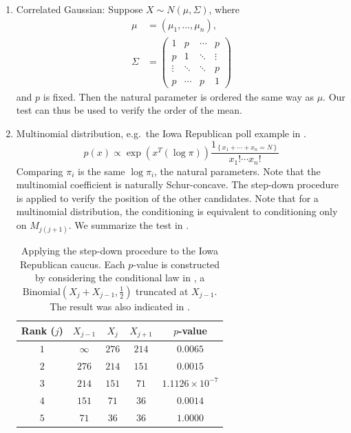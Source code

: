 \documentclass[11pt]{article}
\begin{document}
\begin{enumerate}

\item Correlated Gaussian: Suppose $X \sim N\left(\mu, \Sigma\right)$, where
\begin{align*}
\mu & = \left(\mu_1, \ldots, \mu_n\right), \\
\Sigma & = \begin{pmatrix}
1 & p & \cdots & p \\
p & 1 & \ddots & \vdots \\
\vdots & \ddots & \ddots & p \\
p & \cdots & p & 1
\end{pmatrix}
\end{align*}
and $p$ is fixed. Then the natural parameter is ordered the same way as $\mu$. Our test can thus be used to verify the order of the mean.

\item Multinomial distribution, e.g.\ the Iowa Republican poll example in .
$$p\left(x\right) \propto \exp\left(x^T \left(\log \pi\right)\right) \frac{1_{\left\{x_1 + \cdots + x_n = N\right\}}}{x_1! \cdots x_n!}$$
Comparing $\pi_i$ is the same $\log \pi_i$, the natural parameters. Note that the multinomial coefficient is naturally Schur-concave. The step-down procedure is applied to verify the position of the other candidates. Note that for a multinomial distribution, the conditioning  is equivalent to conditioning only on $M_{j\left(j+1\right)}$. We summarize the test in .

\begin{table}[htbp]
\begin{center}
\begin{tabular}{c c c c c}
\hline
Rank ($j$) & $X_{j-1}$ & $X_j$ & $X_{j+1}$ & $p$-value \\
\hline
$1$ & $\infty$ & $276$ & $214$ & $0.0065$ \\
$2$ & $276$ & $214$ & $151$ & $0.0015$ \\
$3$ & $214$ & $151$ & $71$ & $1.1126 \times 10^{-7}$ \\
$4$ & $151$ & $71$ & $36$ & $0.0014$ \\
$5$ & $71$ & $36$ & $36$ & $1.0000$ \\
\hline
\end{tabular}
\end{center}
\caption{Applying the step-down procedure to the Iowa Republican caucus. Each $p$-value is constructed by considering the conditional law in , a $\text{Binomial}\left(X_j + X_{j-1}, \frac{1}{2}\right)$ truncated at $X_{j-1}$. The result was also indicated in .}
\label{tbl:poll_analysis}
\end{table}


\end{enumerate}
\end{document}
